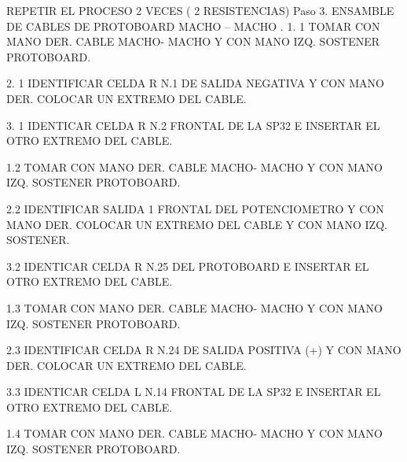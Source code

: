 REPETIR EL PROCESO 2 VECES ( 2 RESISTENCIAS)
Paso 3. ENSAMBLE DE CABLES DE PROTOBOARD MACHO – MACHO .
1.	1   TOMAR CON MANO DER. CABLE MACHO- MACHO Y CON MANO IZQ. SOSTENER PROTOBOARD.







2.	1  IDENTIFICAR CELDA R N.1 DE SALIDA NEGATIVA Y CON MANO DER. COLOCAR UN EXTREMO DEL CABLE.






3.	1 IDENTICAR CELDA R N.2 FRONTAL  DE LA SP32 E INSERTAR EL OTRO EXTREMO DEL CABLE. 










1.2   TOMAR CON MANO DER. CABLE MACHO- MACHO Y CON MANO IZQ. SOSTENER PROTOBOARD.






2.2 IDENTIFICAR SALIDA 1 FRONTAL DEL POTENCIOMETRO Y CON MANO DER. COLOCAR UN EXTREMO DEL CABLE Y CON MANO IZQ. SOSTENER.







 3.2  IDENTICAR CELDA R N.25  DEL PROTOBOARD E INSERTAR EL OTRO EXTREMO DEL CABLE. 









1.3   TOMAR CON MANO DER. CABLE MACHO- MACHO Y CON MANO IZQ. SOSTENER PROTOBOARD.






2.3 IDENTIFICAR CELDA R N.24 DE SALIDA POSITIVA (+)  Y CON MANO DER. COLOCAR UN EXTREMO DEL CABLE.






 3.3 IDENTICAR CELDA L N.14 FRONTAL DE LA SP32 E INSERTAR EL OTRO EXTREMO DEL CABLE. 











1.4  TOMAR CON MANO DER. CABLE MACHO- MACHO Y CON MANO IZQ. SOSTENER PROTOBOARD.






